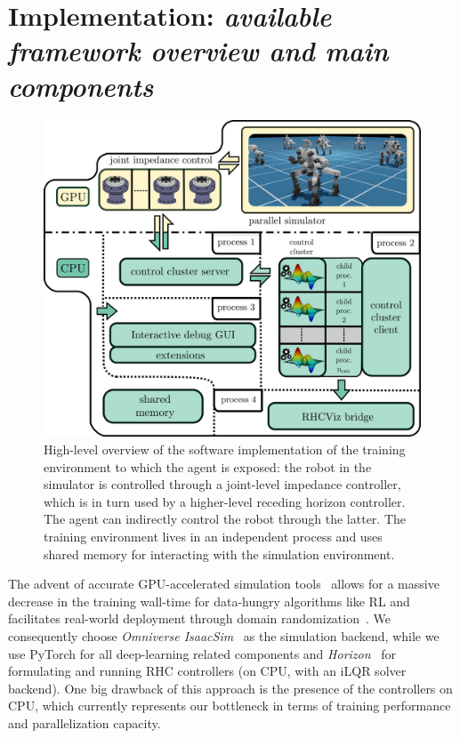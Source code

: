 \section{Implementation: \textnormal{\textit{available framework overview and main components}}}
\begin{figure}[t]
	\centering
	\includegraphics[width=0.9\columnwidth]{imgs/cocluster_arch.pdf}
	\caption{High-level overview of the software implementation of the training environment to which the agent is exposed: the robot in the simulator is controlled through a joint-level impedance controller, which is in turn used by a higher-level receding horizon controller. The agent can indirectly control the robot through the latter. The training environment lives in an independent process and uses shared memory for interacting with the simulation environment.}
	\label{fig:coclbridge_arch}
\end{figure}
The advent of accurate GPU-accelerated simulation tools~\cite{web::isaacsim,rl:mujocoaccelereted2023} allows for a massive decrease in the training wall-time for data-hungry algorithms like RL and facilitates real-world deployment through domain randomization~\cite{rl:rudin2022learning,rl:rudin2022advanced}. We consequently choose \textit{Omniverse IsaacSim}~\cite{web::isaacsim} as the simulation backend, while we use PyTorch for all deep-learning related components and  \textit{Horizon}~\cite{frameworks::horizon_to} for formulating and running RHC controllers (on CPU, with an iLQR solver backend). One big drawback of this approach is the presence of the controllers on CPU, which currently represents our bottleneck in terms of training performance and parallelization capacity.

